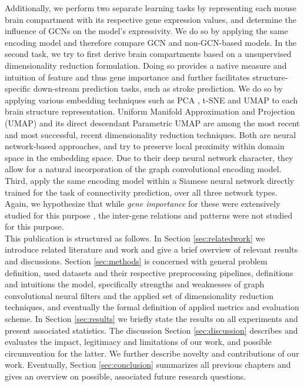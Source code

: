 \documentclass[]{article}
\renewcommand{\cite}{\citep}
\begin{document}
Additionally, we perform two separate learning tasks by representing each mouse brain compartment with its respective gene expression values, and determine the influence of GCNs on the model's expressivity. We do so by applying the same encoding model and therefore compare GCN and non-GCN-based models.
In the second task, we try to first derive brain compartments based on a unsupervised dimensionality reduction formulation. Doing so provides a native measure and intuition of feature and thus gene importance and further facilitates structure-specific down-stream prediction tasks, such as stroke prediction.
We do so by applying various embedding techniques such as PCA \cite{wold1987principal}, t-SNE \cite{van2008visualizing} and UMAP  \cite{mcinnes2018umap} to each brain structure representation. Uniform Manifold Approximation and Projection (UMAP) and its direct descendant Parametric UMAP \cite{sainburg2021parametric} are among the most recent and most successful, recent dimensionality reduction techniques. Both are neural network-based approaches, and try to preserve local proximity within domain space in the embedding space. Due to their deep neural network character, they allow for a natural incorporation of the graph convolutional encoding model. 
Third, apply the same encoding model within a Siamese neural network directly trained for the task of connectivity prediction, over all three network types. Again, we hypothesize that while \textit{gene importance} for these were extensively studied for this purpose \cite{bohland2010clustering, ValkShapingBrainStructure2020, takata_flexible_2021, friston2011functional}, the inter-gene relations and patterns were not studied for this purpose.\\

This publication is structured as follows. In Section \ref{sec:relatedwork} we introduce related literature and work and give a brief overview of relevant results and discussions. Section \ref{sec:methods} is concerned with general problem definition, used datasets and their respective preprocessing pipelines, definitions and intuitions the model, specifically strengths and weaknesses of graph convolutional neural filters and the applied set of dimensionality reduction techniques, and eventually the formal definition of applied metrics and evaluation scheme.
In Section \ref{sec:results} we briefly state the results on all experiments and present associated statistics. The discussion Section \ref{sec:discussion} describes and evaluates the impact, legitimacy and limitations of our work, and possible circumvention for the latter. We further describe novelty and contributions of our work. Eventually, Section \ref{sec:conclusion} summarizes all previous chapters and gives an overview on possible, associated future research questions.\\
\end{document}
